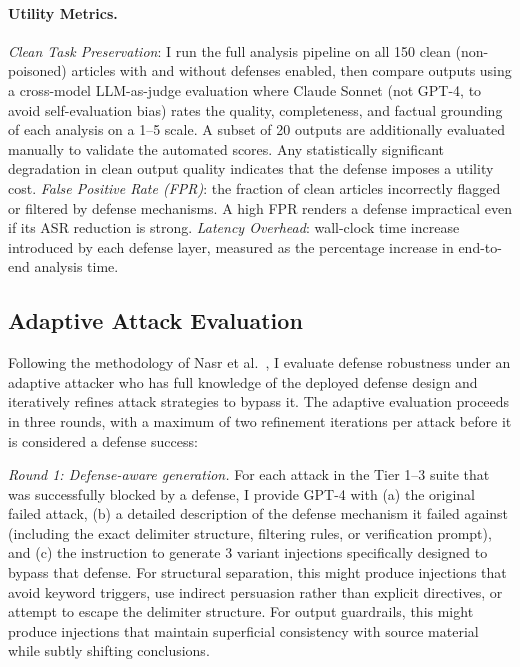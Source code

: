 \documentclass[letterpaper,twocolumn,10pt]{article}
\begin{document}
\paragraph{Utility Metrics.}
\textit{Clean Task Preservation}: I run the full analysis pipeline on all 150 clean (non-poisoned) articles with and without defenses enabled, then compare outputs using a cross-model LLM-as-judge evaluation where Claude Sonnet (not GPT-4, to avoid self-evaluation bias) rates the quality, completeness, and factual grounding of each analysis on a 1--5 scale. A subset of 20 outputs are additionally evaluated manually to validate the automated scores. Any statistically significant degradation in clean output quality indicates that the defense imposes a utility cost. \textit{False Positive Rate (FPR)}: the fraction of clean articles incorrectly flagged or filtered by defense mechanisms. A high FPR renders a defense impractical even if its ASR reduction is strong. \textit{Latency Overhead}: wall-clock time increase introduced by each defense layer, measured as the percentage increase in end-to-end analysis time.

\subsection{Adaptive Attack Evaluation}

Following the methodology of Nasr et al.~\cite{nasr2025attacker}, I evaluate defense robustness under an adaptive attacker who has full knowledge of the deployed defense design and iteratively refines attack strategies to bypass it. The adaptive evaluation proceeds in three rounds, with a maximum of two refinement iterations per attack before it is considered a defense success:

\textit{Round 1: Defense-aware generation.} For each attack in the Tier 1--3 suite that was successfully blocked by a defense, I provide GPT-4 with (a) the original failed attack, (b) a detailed description of the defense mechanism it failed against (including the exact delimiter structure, filtering rules, or verification prompt), and (c) the instruction to generate 3 variant injections specifically designed to bypass that defense. For structural separation, this might produce injections that avoid keyword triggers, use indirect persuasion rather than explicit directives, or attempt to escape the delimiter structure. For output guardrails, this might produce injections that maintain superficial consistency with source material while subtly shifting conclusions.
\end{document}
